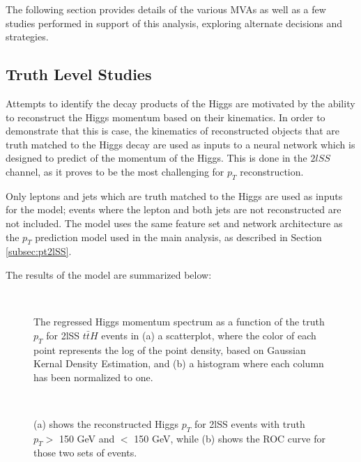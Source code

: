 
The following section provides details of the various MVAs as well as a few studies performed in support of this analysis, exploring alternate decisions and strategies. 

\subsection{Truth Level Studies}
\label{sec:truthPtStudies}
  
Attempts to identify the decay products of the Higgs are motivated by the ability to reconstruct the Higgs momentum based on their kinematics. In order to demonstrate that this is case, the kinematics of reconstructed objects that are truth matched to the Higgs decay are used as inputs to a neural network which is designed to predict of the momentum of the Higgs. This is done in the $2lSS$ channel, as it proves to be the most challenging for $p_T$ reconstruction. 

Only leptons and jets which are truth matched to the Higgs are used as inputs for the model; events where the lepton and both jets are not reconstructed are not included. The model uses the same feature set and network architecture as the $p_T$ prediction model used in the main analysis, as described in Section \ref{subsec:pt2lSS}.

The results of the model are summarized below:

\begin{figure}[H]
    \\
    \caption{The regressed Higgs momentum spectrum as a function of the truth $p_T$ for 2lSS $t\bar{t}H$ events in (a) a scatterplot, where the color of each point represents the log of the point density, based on Gaussian Kernal Density Estimation, and (b) a histogram where each column  has been normalized to one.}
    \label{fig:truth2lSSresults}
\end{figure}

\begin{figure}[H]
    \\
    \caption{(a) shows the reconstructed Higgs $p_T$ for 2lSS events with truth $p_T > $ 150 GeV and $<$ 150 GeV, while (b) shows the ROC curve for those two sets of events.}
    \label{fig:truth2lSSroc}
\end{figure}

